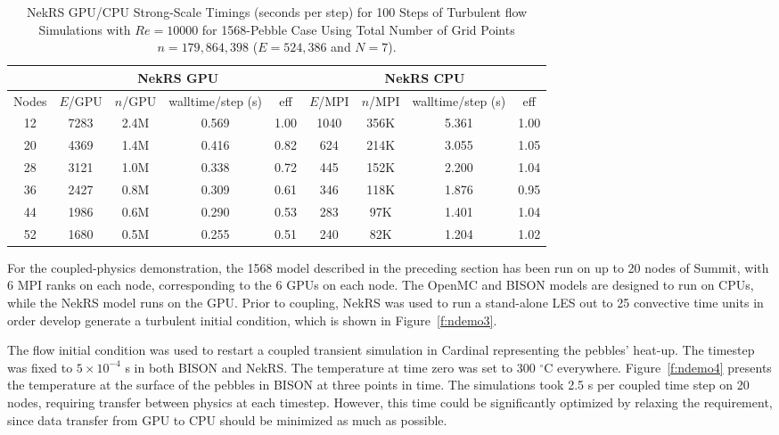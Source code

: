 \begin{table}
  \centering
  \begin{tabular}{c|cccc||cccc}
    \hline 
  \multicolumn{1}{c|}{ } &
  \multicolumn{4}{|c||}{NekRS GPU}  &
  \multicolumn{4}{|c}{NekRS CPU} \\
  \hline
    Nodes  &  $E$/GPU & $n$/GPU & walltime/step (s) & eff & $E$/MPI& $n$/MPI & walltime/step (s) & eff\\
  \hline
    12 & 7283 & 2.4M & 0.569 & 1.00 & 1040 & 356K & 5.361  & 1.00\\
    20 & 4369 & 1.4M & 0.416 & 0.82 & 624 & 214K  & 3.055  & 1.05\\
    28 & 3121 & 1.0M & 0.338 & 0.72 & 445 & 152K & 2.200  & 1.04\\
    36 & 2427 & 0.8M & 0.309 & 0.61 & 346 & 118K & 1.876  & 0.95\\
    44 & 1986 & 0.6M & 0.290 & 0.53 & 283 & 97K & 1.401  & 1.04\\
    52 & 1680 & 0.5M & 0.255 & 0.51 & 240 & 82K & 1.204  & 1.02\\
    \hline \hline
  \end{tabular}
  \caption{NekRS GPU/CPU Strong-Scale Timings (seconds per step) for 100 Steps of Turbulent flow Simulations
   with $Re=10000$ for 1568-Pebble Case Using Total Number of Grid Points $n=179,864,398$ ($E=524,386$ and $N=7$).} 
  \label{tab:nekrs}
\end{table}

For the coupled-physics demonstration, the 1568 model described in the preceding
section has been run on up to 20 nodes of Summit, with 6 MPI ranks on each
node, corresponding to the 6 GPUs on each node. The OpenMC and BISON models are
designed to run on CPUs, while the NekRS model runs on the GPU. Prior to
coupling, NekRS was used to run a stand-alone LES out to 25 convective time
units in order develop generate a turbulent initial condition, which is shown
in Figure~\ref{f:ndemo3}.

The flow initial condition was used to restart a coupled transient simulation in
Cardinal representing the pebbles' heat-up. The timestep was fixed to $5\times
10^{-4}$ s in both BISON and NekRS. The temperature at time zero was set to 300
$^{\circ}$C everywhere. Figure~\ref{f:ndemo4} presents the temperature at the
surface of the pebbles in BISON at three points in time. The simulations took
2.5 s per coupled time step on 20 nodes, requiring transfer between physics at
each timestep. However, this time could be significantly optimized by relaxing
the requirement, since data transfer from GPU to CPU should be minimized as
much as possible.

